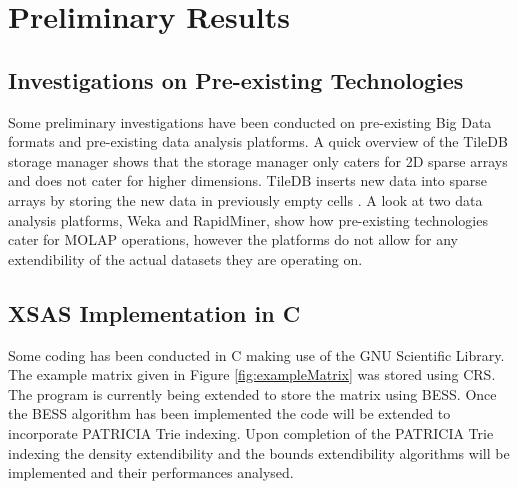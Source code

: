 %
%
%
%
%
\chapter{Preliminary Results} \label{chap:preliminaryresults}
\vspace{-1cm}

\section{Investigations on Pre-existing Technologies}
Some preliminary investigations have been conducted on pre-existing Big Data formats and pre-existing data analysis platforms. A quick overview of the TileDB storage manager shows that the storage manager only caters for 2D sparse arrays and does not cater for higher dimensions. TileDB inserts new data into sparse arrays by storing the new data in previously empty cells \cite{tiledb:tm101}. A look at two data analysis platforms, Weka and RapidMiner, show how pre-existing technologies cater for MOLAP operations, however the platforms do not allow for any extendibility of the actual datasets they are operating on.

\section{XSAS Implementation in C}
Some coding has been conducted in C making use of the GNU Scientific Library. The example matrix given in Figure \ref{fig:exampleMatrix} was stored using CRS. The program is currently being extended to store the matrix using BESS. Once the BESS algorithm has been implemented the code will be extended to incorporate PATRICIA Trie indexing. Upon completion of the PATRICIA Trie indexing the density extendibility and the bounds extendibility algorithms will be implemented and their performances analysed.